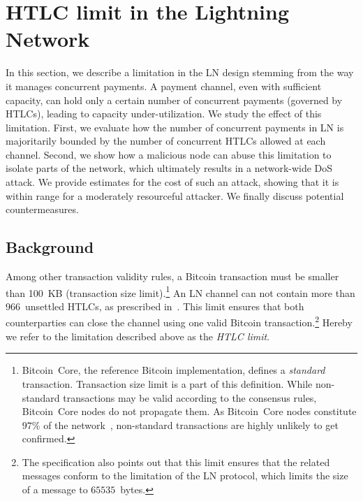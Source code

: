 \section{HTLC limit in the Lightning Network}
\label{sec:attack}

In this section, we describe a limitation in the LN design 
stemming from the way it manages concurrent payments. 
A payment channel, even with sufficient capacity, can hold only 
a certain number of concurrent payments (governed by HTLCs), leading to capacity under-utilization. 
We study the effect of this limitation.
First, we evaluate how the number of concurrent payments in LN 
is majoritarily bounded by the number of concurrent HTLCs allowed at each channel. 
Second, we show how a malicious node can abuse this 
limitation to isolate parts of the network, 
which ultimately results in a network-wide DoS attack.
We provide estimates for the cost of such an attack, showing that it is within range for a moderately resourceful attacker. 
We finally discuss potential countermeasures.

\subsection{Background} \label{max-htlc-background}

Among other transaction validity rules, a Bitcoin transaction must be smaller than 100~KB (transaction size limit\cite{StandardTxBitcoinSE, BitcoinCoreMaxTxWeight}).\footnote{Bitcoin~Core, the reference Bitcoin implementation, defines a \textit{standard} transaction. Transaction size limit is a part of this definition. While non-standard transactions may be valid according to the consensus rules, Bitcoin~Core nodes do not propagate them. As Bitcoin~Core nodes constitute $97\%$ of the network~\cite{CoinDance}, non-standard transactions are highly unlikely to get confirmed.}
An LN channel can not contain more than 966~unsettled HTLCs, as prescribed in~\cite{BOLT2Rationale}.
This limit ensures that both counterparties can close the channel using one valid Bitcoin transaction.\footnote{The specification also points out that this limit ensures that the related messages conform to the limitation of the LN protocol, which limits the size of a message to $65535$~bytes.}
Hereby we refer to the limitation described above as the \textit{HTLC limit}.

